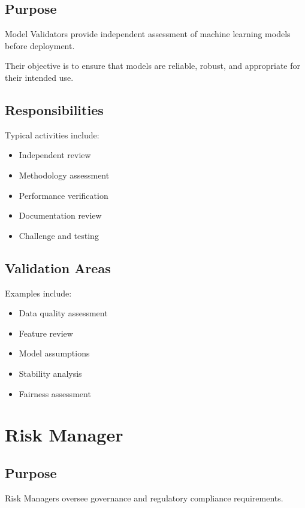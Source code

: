 \subsection{Purpose}

Model Validators provide independent assessment of machine learning models before deployment.

Their objective is to ensure that models are reliable, robust, and appropriate for their intended use.

\subsection{Responsibilities}

Typical activities include:

\begin{itemize}
    \item Independent review
    \item Methodology assessment
    \item Performance verification
    \item Documentation review
    \item Challenge and testing
\end{itemize}

\subsection{Validation Areas}

Examples include:

\begin{itemize}
    \item Data quality assessment
    \item Feature review
    \item Model assumptions
    \item Stability analysis
    \item Fairness assessment
\end{itemize}

\section{Risk Manager}

\subsection{Purpose}

Risk Managers oversee governance and regulatory compliance requirements.

